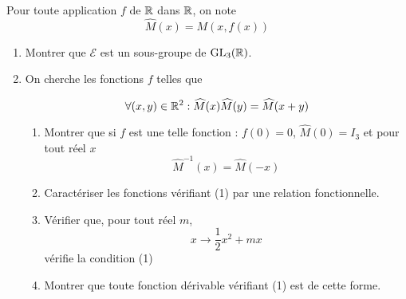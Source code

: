 Pour toute application $f$ de $\mathbb{R}$ dans $\mathbb{R}$, on note
\[\widehat{M}(x)=M(x,f(x))\]
\begin{enumerate}
  \item Montrer que $\mathcal{E}$ est un sous-groupe de
  $\mathrm{GL}_3(\mathbb{R})$.
  \item On cherche les fonctions $f$ telles que

\begin{equation}
  \forall (x,y)\in \mathbb{R}^2 : \widehat{M}(x)\widehat{M}(y)=\widehat{M}(x+y)
\end{equation}

\begin{enumerate}
  \item Montrer que si $f$ est une telle fonction : $f(0)=0$,
  $\widehat{M}(0)=I_3$ et pour tout r{\'e}el $x$
  \[\widehat{M}^{-1}(x)=\widehat{M}(-x)\]
  \item Caract{\'e}riser les fonctions v{\'e}rifiant (1) par une relation
  fonctionnelle.
  \item V{\'e}rifier que, pour tout r{\'e}el $m$,
  \[x\rightarrow\frac{1}{2}x^2+mx\]
  v{\'e}rifie la condition (1)
  \item Montrer que toute fonction d{\'e}rivable v{\'e}rifiant (1) est de
  cette forme.
\end{enumerate}

\end{enumerate}
